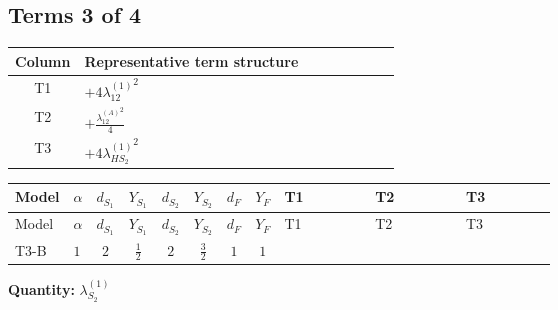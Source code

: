 \documentclass[8pt]{article}
\begin{document}
\begin{landscape}
\subsection*{Terms 3 of 4}
\begin{center}
\begin{tabular}{@{}c >{\raggedright\arraybackslash}p{0.82\linewidth}@{}}
\toprule
Column & Representative term structure \\
\midrule
T1 & \(\displaystyle +4 {\lambda_{12}^{(1)}}^2\) \\
\midrule
T2 & \(\displaystyle +\frac{{\lambda_{12}^{(A)}}^2}{4}\) \\
\midrule
T3 & \(\displaystyle +4 {\lambda_{HS_2}^{(1)}}^2\) \\
\midrule
\bottomrule
\end{tabular}
\end{center}
\smallskip
\tiny
\begin{longtable}{@{}llcccccc >{\raggedright\arraybackslash}p{0.21\linewidth} >{\raggedright\arraybackslash}p{0.21\linewidth} >{\raggedright\arraybackslash}p{0.21\linewidth}@{}}
\toprule
Model & $\alpha$ & $d_{S_1}$ & $Y_{S_1}$ & $d_{S_2}$ & $Y_{S_2}$ & $d_F$ & $Y_F$ & T1 & T2 & T3 \\
\midrule
\endfirsthead
\toprule
Model & $\alpha$ & $d_{S_1}$ & $Y_{S_1}$ & $d_{S_2}$ & $Y_{S_2}$ & $d_F$ & $Y_F$ & T1 & T2 & T3 \\
\midrule
\endhead
T3-B & $1$ & $2$ & $\frac{1}{2}$ & $2$ & $\frac{3}{2}$ & $1$ & $1$ & \scriptsize\adjustbox{max width=\linewidth}{$\begin{gathered} +4 {\lambda_{12}^{(1)}}^2\end{gathered}$} & \scriptsize\adjustbox{max width=\linewidth}{$\begin{gathered} +\frac{{\lambda_{12}^{(A)}}^2}{4}\end{gathered}$} & \scriptsize\adjustbox{max width=\linewidth}{$\begin{gathered} +4 {\lambda_{HS_2}^{(1)}}^2\end{gathered}$} \\
\midrule
\bottomrule
\end{longtable}
\clearpage
\noindent\textbf{Quantity: }$\lambda_{S_2}^{(1)}$\par\smallskip

\end{landscape}
\end{document}
